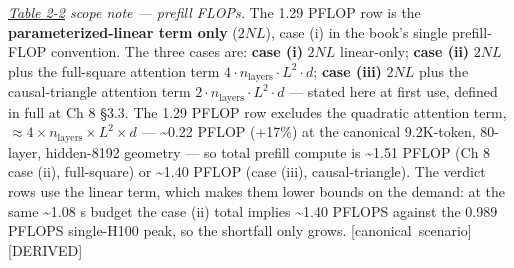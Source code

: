 \emph{\hyperref[tab:2.2]{Table 2-2} scope note --- prefill FLOPs.} The 1.29 PFLOP row is the
\textbf{parameterized-linear term only} (\(2NL\)), case (i) in the
book's single prefill-FLOP convention. The three cases are: \textbf{case
(i)} \(2NL\) linear-only; \textbf{case (ii)} \(2NL\) plus the
full-square attention term
\(4 \cdot n_\text{layers} \cdot L^2 \cdot d\); \textbf{case (iii)}
\(2NL\) plus the causal-triangle attention term
\(2 \cdot n_\text{layers} \cdot L^2 \cdot d\) --- stated here at first
use, defined in full at Ch 8 §3.3. The 1.29 PFLOP row excludes the
quadratic attention term,
\(\approx 4 \times n_\text{layers} \times L^2 \times d\) ---
\textasciitilde0.22 PFLOP (+17\%) at the canonical 9.2K-token, 80-layer,
hidden-8192 geometry --- so total prefill compute is \textasciitilde1.51
PFLOP (Ch 8 case (ii), full-square) or \textasciitilde1.40 PFLOP (case
(iii), causal-triangle). The verdict rows use the linear term, which
makes them lower bounds on the demand: at the same \textasciitilde1.08 s
budget the case (ii) total implies \textasciitilde1.40 PFLOPS against
the 0.989 PFLOPS single-H100 peak, so the shortfall only grows.
\mbox{{[}canonical scenario{]}}\hspace{0pt}\mbox{{[}DERIVED{]}}

